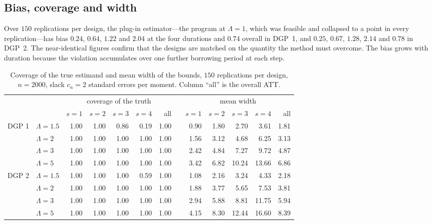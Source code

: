 \documentclass[12pt]{article}
\theoremstyle{remark}
\begin{document}
\subsection{Bias, coverage and width}

Over $150$ replications per design, the plug-in estimator---the program at $\Lambda = 1$,
which was feasible and collapsed to a point in every replication---has bias $0.24$,
$0.64$, $1.22$ and $2.04$ at the four durations and $0.74$ overall in DGP~1, and $0.25$,
$0.67$, $1.28$, $2.14$ and $0.78$ in DGP~2. The near-identical figures confirm that the
designs are matched on the quantity the method must overcome. The bias grows with duration
because the violation accumulates over one further borrowing period at each step.

\begin{table}[ht]
\centering\small
\begin{tabular}{@{}ll rrrrr c rrrrr@{}}
\toprule
& & \multicolumn{5}{c}{coverage of the truth} & & \multicolumn{5}{c}{mean width}\\
\cmidrule(lr){3-7}\cmidrule(lr){9-13}
& & $s{=}1$ & $s{=}2$ & $s{=}3$ & $s{=}4$ & all & &
    $s{=}1$ & $s{=}2$ & $s{=}3$ & $s{=}4$ & all\\
\midrule
DGP 1 & $\Lambda = 1.5$ & 1.00 & 1.00 & 0.86 & 0.19 & 1.00 & &
        0.90 & 1.80 & 2.70 & 3.61 & 1.81\\
      & $\Lambda = 2$   & 1.00 & 1.00 & 1.00 & 1.00 & 1.00 & &
        1.56 & 3.12 & 4.68 & 6.25 & 3.13\\
      & $\Lambda = 3$   & 1.00 & 1.00 & 1.00 & 1.00 & 1.00 & &
        2.42 & 4.84 & 7.27 & 9.72 & 4.87\\
      & $\Lambda = 5$   & 1.00 & 1.00 & 1.00 & 1.00 & 1.00 & &
        3.42 & 6.82 & 10.24 & 13.66 & 6.86\\
\midrule
DGP 2 & $\Lambda = 1.5$ & 1.00 & 1.00 & 1.00 & 0.59 & 1.00 & &
        1.08 & 2.16 & 3.24 & 4.33 & 2.18\\
      & $\Lambda = 2$   & 1.00 & 1.00 & 1.00 & 1.00 & 1.00 & &
        1.88 & 3.77 & 5.65 & 7.53 & 3.81\\
      & $\Lambda = 3$   & 1.00 & 1.00 & 1.00 & 1.00 & 1.00 & &
        2.94 & 5.88 & 8.81 & 11.75 & 5.94\\
      & $\Lambda = 5$   & 1.00 & 1.00 & 1.00 & 1.00 & 1.00 & &
        4.15 & 8.30 & 12.44 & 16.60 & 8.39\\
\bottomrule
\end{tabular}
\caption{Coverage of the true estimand and mean width of the bounds, $150$ replications
per design, $n = 2000$, slack $c_n = 2$ standard errors per moment. Column ``all'' is the
overall ATT.}
\label{tab:cover}
\end{table}
\end{document}
